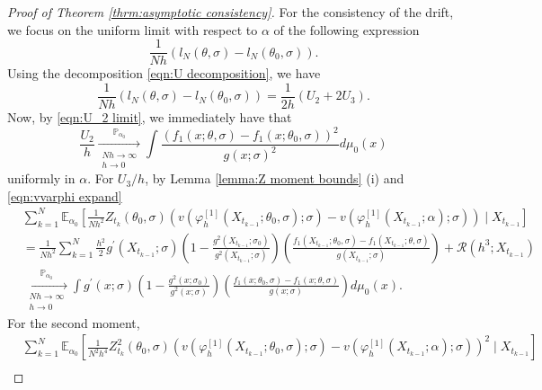 \documentclass[a4paper,12pt]{article}
\numberwithin{equation}{section}
\theoremstyle{plain}
\theoremstyle{definition}
\begin{document}
\begin{appendix}
\begin{proof}[Proof of Theorem \ref{thrm:asymptotic consistency}]
    For the consistency of the drift, we focus on the uniform limit with respect to $\alpha$ of the following expression
    \begin{equation}
        \frac{1}{Nh}\left(l_N(\theta,\sigma)-l_N(\theta_0,\sigma)\right).
    \end{equation}
    Using the decomposition \eqref{eqn:U decomposition}, we have 
    \begin{equation*}
        \frac{1}{Nh}\left(l_N(\theta,\sigma)-l_N(\theta_0,\sigma)\right)=\frac{1}{2h}(U_2+2U_3).
    \end{equation*}
    Now, by \eqref{eqn:U_2 limit}, we immediately have that
    \begin{equation*}
         \frac{U_2}{h}\xrightarrow[\substack{N h\rightarrow\infty \\ h \rightarrow 0}]{\mathbb{P}_{\alpha_0}}\int\frac{\left(f_1(x;\theta,\sigma)-f_1(x;\theta_0,\sigma)\right)^2}{g(x;\sigma)^2}d\mu_0(x)
    \end{equation*}
    uniformly in $\alpha$. For $U_3/h$, by Lemma \ref{lemma:Z moment bounds} (i) and \eqref{eqn:vvarphi expand}
    \begin{align*}
        &\sum_{k=1}^N\mathbb{E}_{\alpha_0}\left[\frac{1}{Nh^2}Z_{t_k}(\theta_0,\sigma)\left(v\left(\varphi^{[1]}_h(X_{t_{k-1}};\theta_0,\sigma) ; \sigma \right)-v\left(\varphi^{[1]}_h(X_{t_{k-1}};\alpha) ; \sigma \right)\right)\mid X_{t_{k-1}}\right]\\
        &=\frac{1}{Nh^2}\sum_{k=1}^N \frac{h^2}{2}g^{\prime}(X_{t_{k-1}} ; \sigma)\left(1-\frac{g^2\left(X_{t_{k-1}} ; \sigma_0\right)}{g^2(X_{t_{k-1}} ; \sigma)}\right)\left(\frac{f_1\left(X_{t_{k-1}} ; \theta_0, \sigma\right)-f_1(X_{t_{k-1}} ; \theta, \sigma)}{g(X_{t_{k-1}} ;\sigma)}\right)+\mathcal{R}(h^3;X_{t_{k-1}})\\
    &\xrightarrow[\substack{N h\rightarrow\infty \\ h \rightarrow 0}]{\mathbb{P}_{\alpha_0}} \int g^{\prime}(x ; \sigma)\left(1-\frac{g^2\left(x ; \sigma_0\right)}{g^2(x ; \sigma)}\right)\left(\frac{f_1\left(x ; \theta_0, \sigma\right)-f_1(x ; \theta, \sigma)}{g(x ;\sigma)}\right)d\mu_0(x).
    \end{align*}
    For the second moment,
    \begin{align*}
         &\sum_{k=1}^N\mathbb{E}_{\alpha_0}\left[\frac{1}{N^2h^4}Z^2_{t_k}(\theta_0,\sigma)\left(v\left(\varphi^{[1]}_h(X_{t_{k-1}};\theta_0,\sigma) ; \sigma \right)-v\left(\varphi^{[1]}_h(X_{t_{k-1}};\alpha) ; \sigma \right)\right)^2\mid X_{t_{k-1}}\right]\\

\end{align*}
\end{proof}
\end{appendix}
\end{document}
